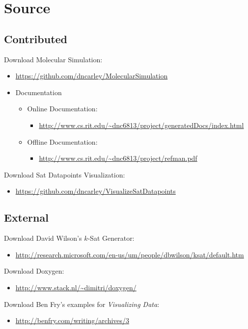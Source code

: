 
\chapter{Source}

\section{Contributed}

\noindent Download Molecular Simulation:

\begin{itemize}
	\item \url{https://github.com/dncarley/MolecularSimulation}
\end{itemize}
\begin{itemize}
\item Documentation
	\begin{itemize}
		\item Online Documentation:
			\begin{itemize}
				\item \url{http://www.cs.rit.edu/~dnc6813/project/generatedDocs/index.html}
			\end{itemize}
		\item Offline Documentation:
		\begin{itemize}
			\item \url{http://www.cs.rit.edu/~dnc6813/project/refman.pdf}
		\end{itemize}
	\end{itemize}
\end{itemize}


\noindent Download {\sc Sat} Datapoints Visualization:
\begin{itemize}
	\item \url{https://github.com/dncarley/VisualizeSatDatapoints}
\end{itemize}

%

\section{External}

\noindent Download David Wilson's $k$-{\sc Sat} Generator:

\begin{itemize}
	\item \url{http://research.microsoft.com/en-us/um/people/dbwilson/ksat/default.htm}
\end{itemize}

\noindent Download Doxygen:

\begin{itemize}
	\item \url{http://www.stack.nl/~dimitri/doxygen/}
\end{itemize}

\noindent Download Ben Fry's examples for \textit{Visualizing Data}:

\begin{itemize}
	\item \url{http://benfry.com/writing/archives/3}
\end{itemize}


